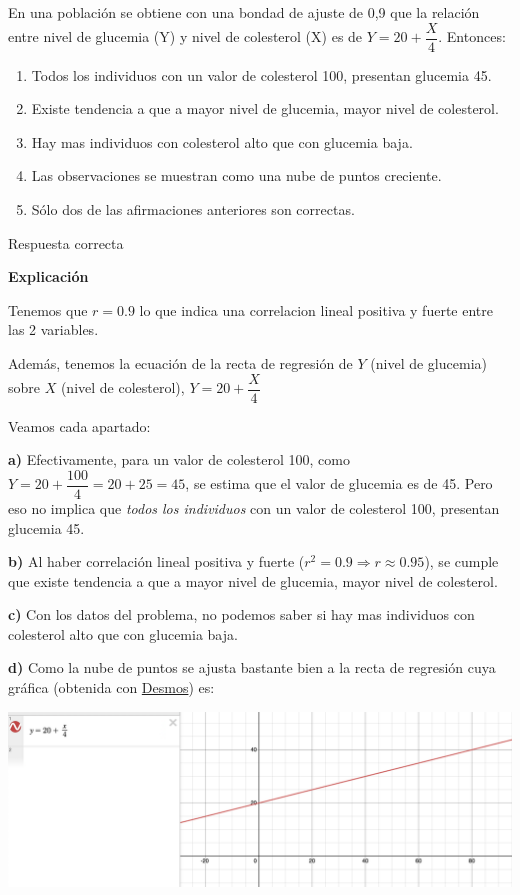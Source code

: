 \documentclass[
]{book}
\providecommand{\tightlist}{%
  \setlength{\itemsep}{0pt}\setlength{\parskip}{0pt}}
\begin{document}
En una población se obtiene con una bondad de ajuste de 0,9 que la relación entre nivel de glucemia (Y) y nivel de colesterol (X) es de \(Y=20 + \dfrac{X}{4}\). Entonces:

\begin{enumerate}
\def\labelenumi{\alph{enumi})}
\tightlist
\item
  Todos los individuos con un valor de colesterol 100, presentan glucemia 45.
\item
  Existe tendencia a que a mayor nivel de glucemia, mayor nivel de colesterol.
\item
  Hay mas individuos con colesterol alto que con glucemia baja.
\item
  Las observaciones se muestran como una nube de puntos creciente.
\item
  Sólo dos de las afirmaciones anteriores son correctas.
\end{enumerate}

Respuesta correcta

\textbf{Explicación}

Tenemos que \(r = 0.9\) lo que indica una correlacion lineal positiva y fuerte entre las 2 variables.

Además, tenemos la ecuación de la recta de regresión de \(Y\) (nivel de glucemia) sobre \(X\) (nivel de colesterol), \(Y=20 + \dfrac{X}{4}\)

Veamos cada apartado:

\textbf{a)} Efectivamente, para un valor de colesterol 100, como \(Y=20 + \dfrac{100}{4}= 20 + 25 = 45\), se estima que el valor de glucemia es de 45. Pero eso no implica que \emph{todos los individuos} con un valor de colesterol 100, presentan glucemia 45.

\textbf{b)} Al haber correlación lineal positiva y fuerte (\(r^2=0.9 \Rightarrow r \approx 0.95\)), se cumple que existe tendencia a que a mayor nivel de glucemia, mayor nivel de colesterol.

\textbf{c)} Con los datos del problema, no podemos saber si hay mas individuos con colesterol alto que con glucemia baja.

\textbf{d)} Como la nube de puntos se ajusta bastante bien a la recta de regresión cuya gráfica (obtenida con \href{https://www.desmos.com/calculator?lang=es}{Desmos}) es:

\includegraphics[width=26.42in]{img/4_1}
\end{document}
